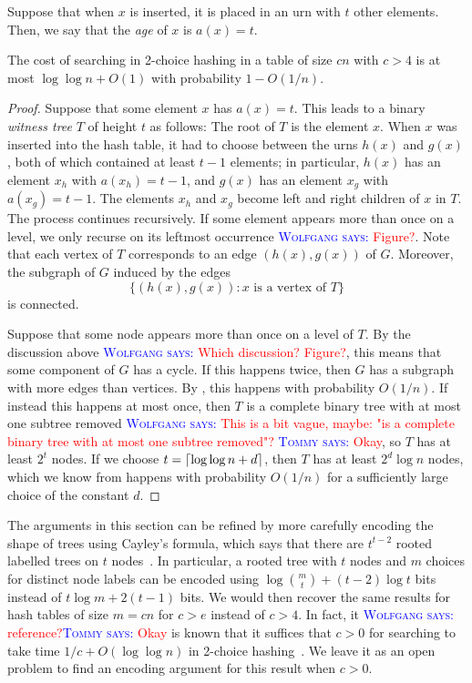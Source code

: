 \documentclass{patmorin}
\newcommand{\aremark}[3]{\textcolor{blue}{\textsc{#1 #2:}}
  \textcolor{red}{\textsf{#3}}}
\newcommand{\tommy}[2][says]{\aremark{Tommy}{#1}{#2}}
\newcommand{\wolfgang}[2][says]{\aremark{Wolfgang}{#1}{#2}}
\begin{document}
Suppose that when $x$ is inserted, it is placed in an urn with $t$
other elements. Then, we say that the \emph{age} of $x$ is $a(x) = t$.
\begin{thm}
  The cost of searching in 2-choice hashing in a table of size $cn$
  with $c > 4$ is at most $\log \log n + O(1)$ with probability $1 -
  O(1/n)$.
\end{thm}
\begin{proof}
  Suppose that some element $x$ has $a(x) = t$. This leads to a binary
  \emph{witness tree} $T$ of height $t$ as follows: The root of $T$ is
  the element $x$. When $x$ was inserted into the hash table, it had
  to choose between the urns $h(x)$ and $g(x)$, both of which
  contained at least $t - 1$ elements; in particular, $h(x)$ has an
  element $x_h$ with $a(x_h) = t - 1$, and $g(x)$ has an element $x_g$
  with $a(x_g) = t - 1$. The elements $x_h$ and $x_g$ become left and
  right children of $x$ in $T$. The process continues recursively. If
  some element appears more than once on a level, we only recurse on
  its leftmost occurrence \wolfgang{Figure?}. 
  Note that each vertex of $T$ corresponds to
  an edge $(h(x), g(x))$ of $G$. Moreover, the subgraph of $G$
  induced by the edges
  \[
    \{(h(x), g(x)) : x \text{ is a vertex of } T\}
  \]
  is connected.

  Suppose that some node appears more than once on a level of $T$. By
  the discussion above \wolfgang{Which discussion? Figure?}, this
  means that some component of $G$ has a cycle. If this happens twice,
  then $G$ has a subgraph with more edges than vertices. By
  , this happens with probability
  $O(1/n)$. If instead this happens at most once, then $T$ is a
  complete binary tree with at most one subtree removed \wolfgang{This
    is a bit vague, maybe: "is a complete binary tree with at most one
    subtree removed"?} \tommy{Okay}, so $T$ has at least $2^t$
  nodes. If we choose $t = {\lceil \log \log n + d \rceil}$, then $T$ has at
  least $2^d \log n$ nodes, which we know from
   happens with probability $O(1/n)$
  for a sufficiently large choice of the constant $d$.
\end{proof}

\begin{rem}
  The arguments in this section can be refined by more carefully
  encoding the shape of trees using Cayley's formula, which says that
  there are $t^{t - 2}$ rooted labelled trees on $t$
  nodes~\cite{cayley:theorem}. In particular, a rooted tree with $t$
  nodes and $m$ choices for distinct node labels can be encoded using
  $\log \binom{m}{t} + (t - 2) \log t$ bits instead of
  $t \log m + 2(t - 1)$ bits. We would then recover the same results
  for hash tables of size $m = cn$ for $c > e$ instead of $c > 4$. In
  fact, it \wolfgang{reference?}\tommy{Okay} is known that it suffices
  that $c > 0$ for searching to take time $1/c + O(\log \log n)$ in
  2-choice hashing~\cite{berenbrink:densehashing}. We leave it as an
  open problem to find an encoding argument for this result when
  $c > 0$.
\end{rem}
\end{document}
